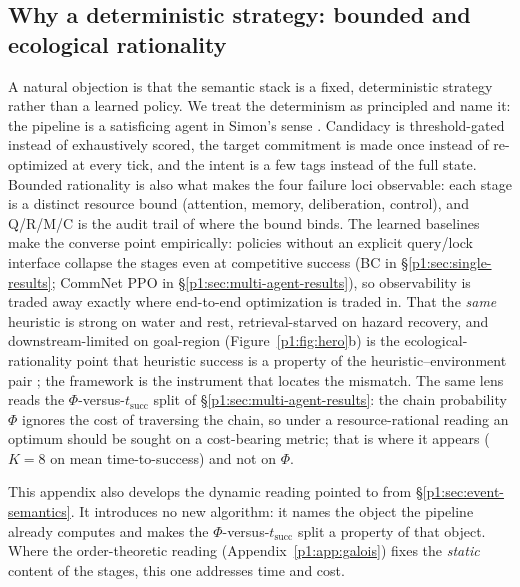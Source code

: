 \documentclass{article}
\begin{document}
\subsection*{Why a deterministic strategy: bounded and ecological rationality}
A natural objection is that the semantic stack is a fixed, deterministic strategy rather than a learned policy. We treat the determinism as principled and name it: the pipeline is a satisficing agent in Simon's sense \citep{simon1955behavioral,simon1956rational}. Candidacy is threshold-gated instead of exhaustively scored, the target commitment is made once instead of re-optimized at every tick, and the intent is a few tags instead of the full state. Bounded rationality is also what makes the four failure loci observable: each stage is a distinct resource bound (attention, memory, deliberation, control), and Q/R/M/C is the audit trail of where the bound binds. The learned baselines make the converse point empirically: policies without an explicit query/lock interface collapse the stages even at competitive success (BC in \S\ref{p1:sec:single-results}; CommNet PPO in \S\ref{p1:sec:multi-agent-results}), so observability is traded away exactly where end-to-end optimization is traded in. That the \emph{same} heuristic is strong on water and rest, retrieval-starved on hazard recovery, and downstream-limited on goal-region (Figure~\ref{p1:fig:hero}b) is the ecological-rationality point that heuristic success is a property of the heuristic--environment pair \citep{simon1956rational,gigerenzer1996reasoning}; the framework is the instrument that locates the mismatch. The same lens reads the $\Phi$-versus-$t_{\mathrm{succ}}$ split of \S\ref{p1:sec:multi-agent-results}: the chain probability $\Phi$ ignores the cost of traversing the chain, so under a resource-rational reading \citep{lieder2020resource} an optimum should be sought on a cost-bearing metric; that is where it appears ($K{=}8$ on mean time-to-success) and not on $\Phi$.

This appendix also develops the dynamic reading pointed to from
\S\ref{p1:sec:event-semantics}. It introduces no new algorithm: it names the
object the pipeline already computes and makes the
$\Phi$-versus-$t_{\mathrm{succ}}$ split a property of that object. Where the
order-theoretic reading (Appendix~\ref{p1:app:galois}) fixes the \emph{static}
content of the stages, this one addresses time and cost.
\end{document}
